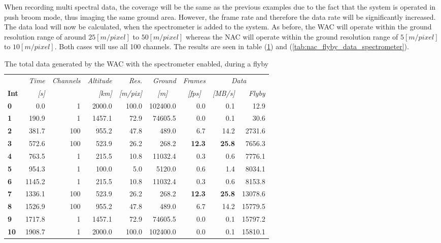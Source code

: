 When recording multi spectral data, the coverage will be the same as the previous examples due to the fact that the system is operated in push broom mode, thus imaging the same ground area. However, the frame rate and therefore the data rate will be significantly increased. The data load will now be calculated, when the spectrometer is added to the system. As before, the WAC will operate within the ground resolution range of around $25[m/pixel]$ to $50[m/pixel]$ whereas the NAC will operate within the ground resolution range of $5[m/pixel]$ to $10[m/pixel]$. Both cases will use all 100 channels. The results are seen in table (\ref{tab:wac_flyby_data_spectrometer}) and (\ref{tab:nac_flyby_data_spectrometer}).
\begin{table}[htb]
  \centering
    \begin{tabular}{l|r|r|r|r|r|r|r|r|}
      & \textit{Time} & \textit{Channels} & \textit{Altitude} & \textit{Res.} & \textit{Ground} & \textit{Frames } & \multicolumn{2}{c}{\textit{Data}} \\
\textbf{Int} & \textit{[s]} & \textit{} & \textit{[km]} & \textit{[m/pix]} & \multicolumn{1}{c|}{\textit{[m]}} & \multicolumn{1}{c|}{\textit{[fps]}} & \textit{[MB/s]} & \multicolumn{1}{r}{\textit{Flyby}} \bigstrut[b]\\
\hline
\textbf{0} & 0.0   & 1     & 2000.0 & 100.0 & 102400.0 & 0.0   & 0.1   & 12.9 \bigstrut[t]\\
\textbf{1} & 190.9 & 1     & 1457.1 & 72.9  & 74605.5 & 0.0   & 0.1   & 30.6 \\
\textbf{2} & 381.7 & 100   & 955.2 & 47.8  & 489.0 & 6.7   & 14.2  & 2731.6 \\
\textbf{3} & 572.6 & 100   & 523.9 & 26.2  & 268.2 & \textbf{12.3} & \textbf{25.8} & 7656.3 \\
\textbf{4} & 763.5 & 1     & 215.5 & 10.8  & 11032.4 & 0.3   & 0.6   & 7776.1 \\
\textbf{5} & 954.3 & 1     & 100.0 & 5.0   & 5120.0 & 0.6   & 1.4   & 8034.1 \\
\textbf{6} & 1145.2 & 1     & 215.5 & 10.8  & 11032.4 & 0.3   & 0.6   & 8153.8 \\
\textbf{7} & 1336.1 & 100   & 523.9 & 26.2  & 268.2 & \textbf{12.3} & \textbf{25.8} & 13078.6 \\
\textbf{8} & 1526.9 & 100   & 955.2 & 47.8  & 489.0 & 6.7   & 14.2  & 15779.5 \\
\textbf{9} & 1717.8 & 1     & 1457.1 & 72.9  & 74605.5 & 0.0   & 0.1   & 15797.2 \\
\textbf{10} & 1908.7 & 1     & 2000.0 & 100.0 & 102400.0 & 0.0   & 0.1   & 15810.1 \\
\end{tabular}%
  \caption{The total data generated by the WAC with the spectrometer enabled, during a flyby}
  \label{tab:wac_flyby_data_spectrometer}%
\end{table}%
